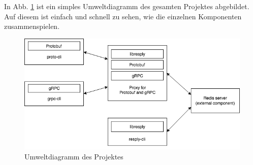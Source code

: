 \documentclass[a4paper,ngerman]{article}
\begin{document}
In Abb. \ref{img:structur} ist ein simples Umweltdiagramm des gesamten Projektes abgebildet. Auf diesem ist einfach und schnell zu sehen, wie die einzelnen Komponenten zusammenspielen.

\begin{figure}[H]
        \centering
        \includegraphics[width=1\linewidth]{umwelt}
        \caption{Umweltdiagramm des Projektes}
        \label{img:structur}
\end{figure}
\end{document}
